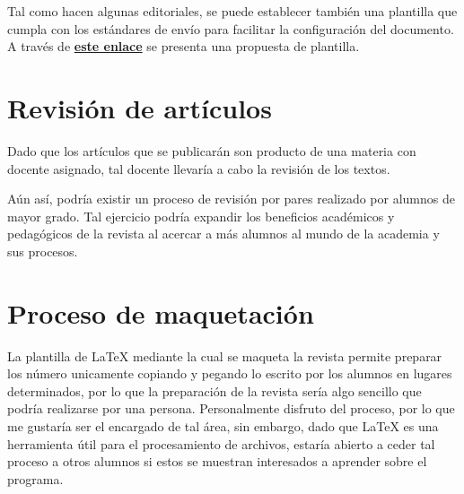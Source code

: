 \documentclass{Manual}
\begin{document}
Tal como hacen algunas editoriales, se puede establecer también una plantilla que cumpla con los estándares de envío para facilitar la configuración del documento. A través de \textbf{\href{https://docs.google.com/document/d/1M7Ag4gmHuryCKiGC0duv6faO6SFfbrNe-7jA6rKuEZ4/edit?usp=sharing}{este enlace}} se presenta una propuesta de plantilla. 

\section{Revisión de artículos}

Dado que los artículos que se publicarán son producto de una materia con docente asignado, tal docente llevaría a cabo la revisión de los textos.

Aún así, podría existir un proceso de revisión por pares realizado por alumnos de mayor grado. Tal ejercicio podría expandir los beneficios académicos y pedagógicos de la revista al acercar a más alumnos al mundo de la academia y sus procesos.

\section{Proceso de maquetación}

La plantilla de LaTeX mediante la cual se maqueta la revista permite preparar los número unicamente copiando y pegando lo escrito por los alumnos en lugares determinados, por lo que la preparación de la revista sería algo sencillo que podría realizarse por una persona. Personalmente disfruto del proceso, por lo que me gustaría ser el encargado de tal área, sin embargo, dado que LaTeX es una herramienta útil para el procesamiento de archivos, estaría abierto a ceder tal proceso a otros alumnos si estos se muestran interesados a aprender sobre el programa. 



    
    \appendix
    
\end{document}
